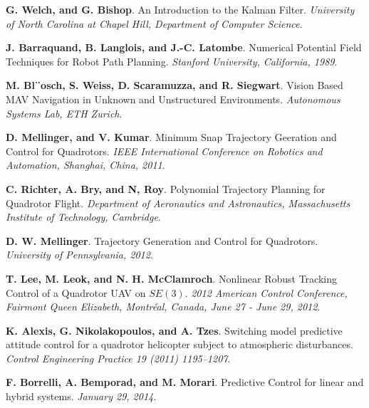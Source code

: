 \documentclass[11pt, a4paper, onecolumn, fleqn, twoside, titlepage, openright]{book}
\begin{document}
\begin{thebibliography}{1}
		\textbf{G. Welch, and G. Bishop}.
		An Introduction to the Kalman Filter.
		\textit{University of North Carolina at Chapel Hill, Department of Computer Science}.

		\textbf{J. Barraquand, B. Langlois, and J.-C. Latombe}.
		Numerical Potential Field Techniques for Robot Path Planning.
		\textit{Stanford University, California, 1989}.

		\textbf{M. Bl¨osch, S. Weiss, D. Scaramuzza, and R. Siegwart}.
		Vision Based MAV Navigation in Unknown and Unstructured Environments.
		\textit{Autonomous Systems Lab, ETH Zurich}.

		\textbf{D. Mellinger, and V. Kumar}.
		Minimum Snap Trajectory Geeration and Control for Quadrotors.
		\textit{IEEE International Conference on Robotics and Automation, Shanghai, China, 2011}.

		\textbf{C. Richter, A. Bry, and N, Roy}.
		Polynomial Trajectory Planning for Quadrotor Flight.
		\textit{Department of Aeronautics and Astronautics, Massachusetts Institute of Technology, Cambridge}.

		\textbf{D. W. Mellinger}.
		Trajectory Generation and Control for Quadrotors.
		\textit{University of Pennsylvania, 2012}.

		\textbf{T. Lee, M. Leok, and N. H. McClamroch}.
		Nonlinear Robust Tracking Control of a Quadrotor UAV on $SE(3)$.
		\textit{2012 American Control Conference, Fairmont Queen Elizabeth, Montréal, Canada, June 27 - June 29, 2012}.		

		\textbf{K. Alexis, G. Nikolakopoulos, and A. Tzes}.
		Switching model predictive attitude control for a quadrotor helicopter subject to atmospheric disturbances.
		\textit{Control Engineering Practice 19 (2011) 1195–1207}.

		\textbf{F. Borrelli, A. Bemporad, and M. Morari}.
		Predictive Control for linear and hybrid systems.
		\textit{January 29, 2014}.

	\end{thebibliography}
\end{document}
